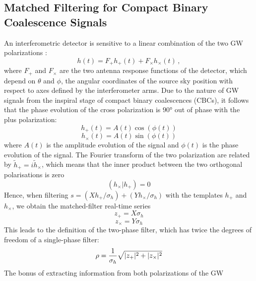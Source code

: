 \documentclass[binding=0.6cm, LaM]{sapthesis}
\begin{document}
\subsection{Matched Filtering for Compact Binary Coalescence Signals}
\label{subsec:mfcbc}
	An interferometric detector is sensitive to a linear combination 
	of the two GW polarizations \cite{26}: 
                \begin{equation}
                h(t) = F_{+}h_{+} (t) + F_{\times}h_{\times}(t)\,,
                \end{equation}
	where $F_{+}$ and $F_{\times}$ are the two antenna response functions of the detector, 
	which depend on $\theta$ and $\phi$, 
	the angular coordinates of the source sky position with respect to axes defined by the interferometer arms. 
	Due to the nature of GW signals from the inspiral stage of compact binary coalescences (CBCs), 
	it follows that the phase evolution of the cross polarization is $\ang{90}$ out of phase with the plus polarization:
		\begin{equation}
			h_{+}(t) = A(t) \cos (\phi (t))
		\end{equation}
		\begin{equation}
			h_{\times}(t) = A(t) \sin (\phi (t))  
		\end{equation}
	where $A(t)$ is the amplitude evolution of the signal 
	and $\phi(t)$ is the phase evolution of the signal. 
	The Fourier transform of the two polarization are related by $\tilde h_{+} = i\tilde{h}_{\times}$, 
	which means that the inner product between the two orthogonal polarisations is zero 
		\begin{equation}
			(h_{\times}|h_{+}) = 0
		\end{equation}
	Hence, when filtering  $s = (Xh_{+}/\sigma_{h}) + (Y h_{\times}/\sigma_{h})$ 
	with the templates $h_{+}$ and $h_{\times}$, we obtain the matched-filter real-time series
		\begin{equation}
			z_{+} = X\sigma_{h}
		\end{equation}
		\begin{equation}
			z_{\times} = Y \sigma_{h} 
		\end{equation}
	This leads to the definition of the two-phase filter, 
	which has twice the degrees of freedom of a single-phase filter:
		\begin{equation}
			\rho = {1 \over \sigma_h} \sqrt{|z_{+}| ^2+ |z_{\times}|^2}
		\end{equation}
	The bonus of extracting information from both polarizations of the GW 
\end{document}
